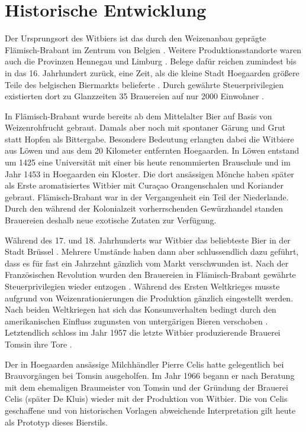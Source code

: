 \documentclass[a4paper,parskip=half]{scrartcl}
\begin{document}
\section*{Historische Entwicklung}

Der Ursprungsort des Witbiers ist das durch den Weizenanbau geprägte
Flämisch-Brabant im Zentrum von Belgien \parencite[44]{Roncoroni2018}.
Weitere Produktionsstandorte waren auch die Provinzen Hennegau und
Limburg \parencite[118]{Strottner1999}.
Belege dafür reichen zumindest bis in das 16. Jahrhundert
zurück, eine Zeit, als die kleine Stadt Hoegaarden größere
Teile des belgischen Biermarkts belieferte \parencite[46]{Mulder2020}. 
Durch gewährte Steuerprivilegien existierten dort zu Glanzzeiten 35
Brauereien auf nur 2000 Einwohner \parencite[27]{Sparrow2002}.

In Flämisch-Brabant wurde bereits ab dem Mittelalter Bier auf
Basis von Weizenrohfrucht gebraut. Damals aber noch mit
spontaner Gärung und Grut statt Hopfen als Bittergabe.
Besondere Bedeutung erlangten dabei die Witbiere aus Löwen
und aus dem 20 Kilometer entfernten Hoegaarden. In Löwen
entstand um 1425 eine Universität mit einer bis heute renommierten Brauschule
und im Jahr 1453 in Hoegaarden ein Kloster. Die dort ansässigen
Mönche haben später als Erste aromatisiertes Witbier mit
Curaçao Orangenschalen und Koriander gebraut. Flämisch-Brabant war
in der Vergangenheit ein Teil der Niederlande. Durch den während der
Kolonialzeit vorherrschenden Gewürzhandel standen
Brauereien deshalb neue exotische Zutaten zur Verfügung.
\parencite[1,4]{Strottner1999}

Während des 17. und 18. Jahrhunderts war Witbier das beliebteste Bier
in der Stadt Brüssel \parencite{Zainasheff2007}.
Mehrere Umstände haben dann aber schlussendlich dazu geführt, dass
es für fast ein Jahrzehnt gänzlich vom Markt verschwunden ist.
Nach der Französischen Revolution wurden den Brauereien in
Flämisch-Brabant gewährte Steuerprivilegien wieder entzogen
\parencite[44]{Roncoroni2018}. Während des Ersten Weltkrieges
musste aufgrund von Weizenrationierungen die Produktion gänzlich
eingestellt werden. Nach beiden Weltkriegen hat sich
das Konsumverhalten bedingt durch den amerikanischen
Einfluss zugunsten von untergärigen Bieren verschoben \parencite[4]{Strottner1999}.
Letztendlich schloss im Jahr 1957 die letzte
Witbier produzierende Brauerei Tomsin ihre Tore \parencite[44]{Roncoroni2018}.

Der in Hoegaarden ansässige Milchhändler Pierre
Celis hatte gelegentlich bei Brauvorgängen bei Tomsin ausgeholfen. Im
Jahr 1966 begann er nach Beratung mit dem ehemaligen
Braumeister von Tomsin und der Gründung der Brauerei Celis
(später De Kluis) wieder mit der Produktion von Witbier. Die von
Celis geschaffene und von historischen Vorlagen abweichende Interpretation
gilt heute als Prototyp dieses Bierstils.
\parencite[37,49]{Hieronymus2010} 
\end{document}
